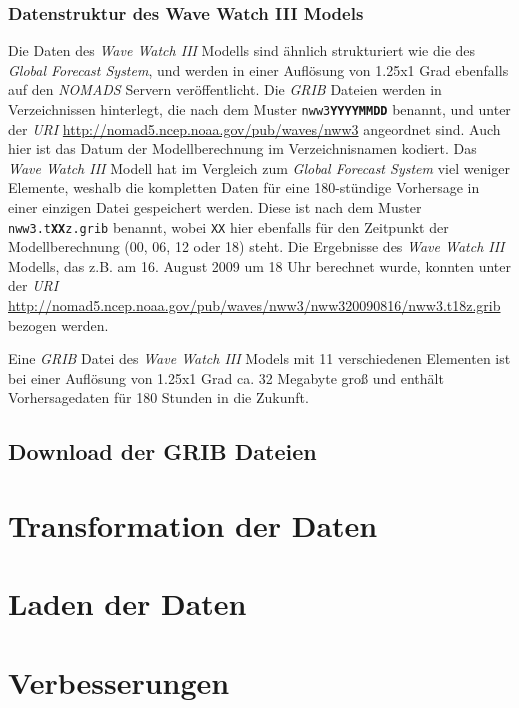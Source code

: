 \subsubsection{Datenstruktur des Wave Watch III Models}

Die Daten des \textit{Wave Watch III} Modells sind ähnlich
strukturiert wie die des \textit{Global Forecast System}, und werden
in einer Auflösung von 1.25x1 Grad ebenfalls auf den \textit{NOMADS}
Servern veröffentlicht. Die \textit{GRIB} Dateien werden in
Verzeichnissen hinterlegt, die nach dem Muster
\texttt{nww3\textbf{YYYYMMDD}} benannt, und unter der \textit{URI}
\url{http://nomad5.ncep.noaa.gov/pub/waves/nww3} angeordnet sind. Auch
hier ist das Datum der Modellberechnung im Verzeichnisnamen
kodiert. Das \textit{Wave Watch III} Modell hat im Vergleich zum
\textit{Global Forecast System} viel weniger Elemente, weshalb die
kompletten Daten für eine 180-stündige Vorhersage in einer einzigen
Datei gespeichert werden. Diese ist nach dem Muster
\texttt{nww3.t\textbf{XX}z.grib} benannt, wobei \texttt{XX} hier
ebenfalls für den Zeitpunkt der Modellberechnung (00, 06, 12 oder 18)
steht. Die Ergebnisse des \textit{Wave Watch III} Modells, das z.B. am
16. August 2009 um 18 Uhr berechnet wurde, konnten unter der
\textit{URI}
\url{http://nomad5.ncep.noaa.gov/pub/waves/nww3/nww320090816/nww3.t18z.grib}
bezogen werden.

Eine \textit{GRIB} Datei des \textit{Wave Watch III} Models mit 11
verschiedenen Elementen ist bei einer Auflösung von 1.25x1 Grad ca. 32
Megabyte groß und enthält Vorhersagedaten für 180 Stunden in die
Zukunft.

\subsection{Download der GRIB Dateien}
\label{subsec:download}

\section{Transformation der Daten}
\section{Laden der Daten}
\section{Verbesserungen}

